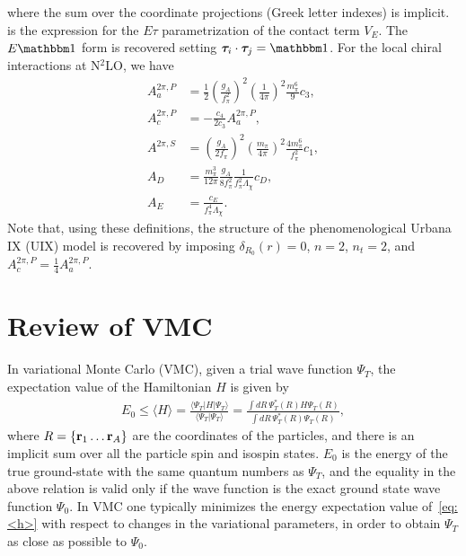 \documentclass[aps,prc,twocolumn,superscriptaddress,floatfix]{revtex4-1}
\begin{document}
where the sum over the coordinate projections (Greek letter indexes) is implicit.
 is the expression for the $E\tau$ parametrization of the contact term $V_E$.
The $E\mathbbm1$ form is recovered setting $\bm{\tau}_i\cdot\bm{\tau}_j=\mathbbm1$.
For the local chiral interactions at N$^2$LO, we have
\begin{align}
A_a^{2\pi,P}&=\frac{1}{2}\left(\frac{g_A}{f_\pi^2}\right)^2\left(\frac{1}{4\pi}\right)^2
\frac{m_\pi^6}{9}c_3 \nonumber, \\
A_c^{2\pi,P}&=-\frac{c_4}{2c_3}A_a^{2\pi,P} \nonumber, \\
A^{2\pi,S}&=\left(\frac{g_A}{2f_\pi}\right)^2\left(\frac{m_\pi}{4\pi}\right)^2\frac{4m_\pi^6}{f_\pi^2}c_1
\nonumber, \\
A_D&=\frac{m_\pi^3}{12\pi}\frac{g_A}{8f_\pi^2}\frac{1}{f_\pi^2\Lambda_\chi}c_D
\nonumber, \\
A_E&=\frac{c_E}{f_\pi^4\Lambda_\chi}.
\end{align}
Note that, using these definitions, the structure of the phenomenological Urbana IX (UIX) model
is recovered by imposing $\delta_{R_0}(r)=0$, $n=2$, $n_t=2$, and $A_c^{2\pi,P}=\frac{1}{4}A_a^{2\pi,P}$.


\section{Review of VMC}
\label{sec:vmc}
In variational Monte Carlo (VMC), given a trial wave function $\Psi_T$,
the expectation value of the Hamiltonian $H$ is given by
\begin{align}
\!\!\!E_0\leq\langle H\rangle=\frac{\langle\Psi_T|H|\Psi_T\rangle}{\langle\Psi_T|\Psi_T\rangle}
=\frac{\displaystyle\int\!dR\,\Psi_T^*(R)H\Psi_T(R)}
{\displaystyle\int\!dR\,\Psi_T^*(R)\Psi_T(R)} ,
\label{eq:<h>}
\end{align}
where $R=\{\vb{r}_1\dots\vb{r}_A\}$ are the coordinates of the particles, and there is an 
implicit sum over all the particle spin and isospin states. 
$E_0$ is the energy of the true ground-state with the same quantum numbers as $\Psi_T$, 
and the equality in the above relation is valid only if the wave function is the exact
ground state wave function $\Psi_0$. In VMC one typically minimizes the energy expectation 
value of~\cref{eq:<h>} with respect to changes in the variational parameters, in order to 
obtain $\Psi_T$ as close as possible to $\Psi_0$. 
\end{document}
